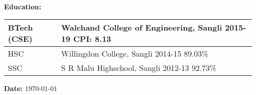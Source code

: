 \documentclass[a4paper,11pt]{article}
\begin{document}
\begin{center}
\begin{minipage}[t]{0.6\textwidth}
			\\
			\vspace{0.7cm}
            \begin{LARGE}
				\textbf{Education:}
				\medskip\linebreak%
				\begin{tabu} to \textwidth {X[1.15l]X[6l]}
			   		\normalsize BTech (CSE) & {\normalsize Walchand College of Engineering, Sangli} \linebreak \normalsize 2015-19 \hspace{1cm}\normalsize CPI: 8.13\medskip\\
			   		\hline
			   		\normalsize HSC & \normalsize Willingdon College, Sangli \linebreak \normalsize 2014-15 \hspace{1cm}\normalsize 89.03\%\medskip\\
					\hline
				    \normalsize SSC & \normalsize S R Malu Highschool, Sangli \linebreak\normalsize 2012-13 \hspace{1cm}\normalsize 92.73\%\medskip\\
				\end{tabu}
			\end{LARGE}
		\end{minipage}%
		\linebreak\linebreak\linebreak
    \hline
		\medskip
		\raggedright
		\begin{minipage}[t]{0.5\textwidth}
			\raggedright
			\textbf{Date:} \today
		\end{minipage}%
	\end{center}
\end{document}
